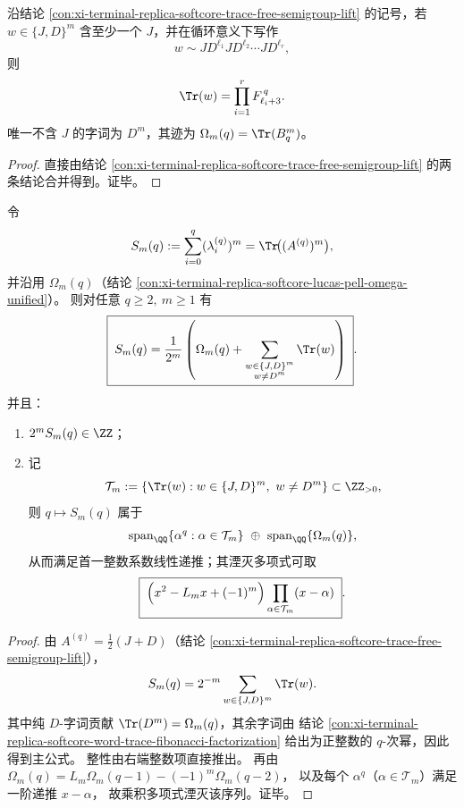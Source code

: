 \begin{conclusion}[含秩一字母通道的纯乘法迹结构]\label{con:xi-terminal-replica-softcore-word-trace-fibonacci-factorization}
沿结论 \ref{con:xi-terminal-replica-softcore-trace-free-semigroup-lift} 的记号，若
\(w\in\{J,D\}^m\) 含至少一个 \(J\)，并在循环意义下写作
\[
w\sim J D^{\ell_1}J D^{\ell_2}\cdots J D^{\ell_r},
\]
则
\[
\Tr(w)=\prod_{i=1}^{r}F_{\ell_i+3}^{\,q}.
\]
唯一不含 \(J\) 的字词为 \(D^m\)，其迹为 \(\Omega_m(q)=\Tr(B_q^m)\)。
\end{conclusion}
\begin{proof}
直接由结论 \ref{con:xi-terminal-replica-softcore-trace-free-semigroup-lift} 的两条结论合并得到。证毕。
\end{proof}

\begin{conclusion}[例外幂和的全阶字词闭式与递推闭包]\label{con:xi-terminal-replica-softcore-exceptional-power-sum-word-closed-form}
令
\[
S_m(q):=\sum_{i=0}^{q}(\lambda_i^{(q)})^m=\Tr\!\bigl((A^{(q)})^m\bigr),
\]
并沿用 \(\Omega_m(q)\)（结论 \ref{con:xi-terminal-replica-softcore-lucas-pell-omega-unified}）。
则对任意 \(q\ge2,\ m\ge1\) 有
\[
\boxed{\;
S_m(q)=\frac1{2^m}\left(
\Omega_m(q)+
\sum_{\substack{w\in\{J,D\}^m\\ w\neq D^m}}
\Tr(w)
\right)\; }.
\]
并且：
\begin{enumerate}
  \item \(2^mS_m(q)\in\ZZ\)；
  \item 记
  \[
  \mathcal T_m:=\{\Tr(w):w\in\{J,D\}^m,\ w\neq D^m\}\subset\ZZ_{>0},
  \]
  则 \(q\mapsto S_m(q)\) 属于
  \[
  \mathrm{span}_{\QQ}\{\alpha^q:\alpha\in\mathcal T_m\}
  \ \oplus\
  \mathrm{span}_{\QQ}\{\Omega_m(q)\},
  \]
  从而满足首一整数系数线性递推；其湮灭多项式可取
  \[
  \boxed{\;
  \Bigl(x^2-L_mx+(-1)^m\Bigr)\prod_{\alpha\in\mathcal T_m}(x-\alpha)\; }.
  \]
\end{enumerate}
\end{conclusion}
\begin{proof}
由 \(A^{(q)}=\frac12(J+D)\)（结论 \ref{con:xi-terminal-replica-softcore-trace-free-semigroup-lift}），
\[
S_m(q)=2^{-m}\sum_{w\in\{J,D\}^m}\Tr(w).
\]
其中纯 \(D\)-字词贡献 \(\Tr(D^m)=\Omega_m(q)\)，其余字词由
结论 \ref{con:xi-terminal-replica-softcore-word-trace-fibonacci-factorization}
给出为正整数的 \(q\)-次幂，因此得到主公式。
整性由右端整数项直接推出。
再由 \(\Omega_m(q)=L_m\Omega_m(q-1)-(-1)^m\Omega_m(q-2)\)，
以及每个 \(\alpha^q\)（\(\alpha\in\mathcal T_m\)）满足一阶递推 \(x-\alpha\)，
故乘积多项式湮灭该序列。证毕。
\end{proof}

